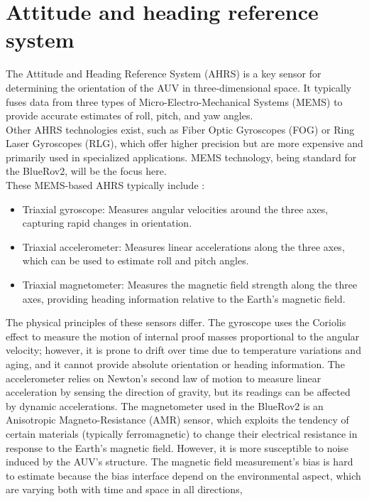 \section{Attitude and heading reference system}
The Attitude and Heading Reference System (AHRS) is a key sensor for determining the orientation of the AUV in three-dimensional space.
It typically fuses data from three types of Micro-Electro-Mechanical Systems (MEMS) to provide accurate estimates of roll, pitch, and yaw angles.\\
Other AHRS technologies exist, such as Fiber Optic Gyroscopes (FOG) or Ring Laser Gyroscopes (RLG), which offer higher precision but are more expensive and primarily used in 
specialized applications. MEMS technology, being standard for the BlueRov2, will be the focus here.\\
These MEMS-based AHRS typically include \cite{klugaMotionSensorsData2024}:
\begin{itemize}
    \item Triaxial gyroscope: Measures angular velocities around the three axes, capturing rapid changes in orientation.
    \item Triaxial accelerometer: Measures linear accelerations along the three axes, which can be used to estimate roll and pitch angles.
    \item Triaxial magnetometer: Measures the magnetic field strength along the three axes, providing heading information relative to the Earth's magnetic field.
\end{itemize}
The physical principles of these sensors differ. The gyroscope uses the Coriolis effect to measure the motion of internal proof masses proportional to the angular 
velocity; however, it is prone to drift over time due to temperature variations and aging, and it cannot provide absolute orientation or heading information. 
The accelerometer relies on Newton's second law of motion to measure linear acceleration by sensing the direction of gravity, but its readings can be affected by dynamic accelerations. 
The magnetometer used in the BlueRov2 is an Anisotropic Magneto-Resistance (AMR) sensor, which exploits the tendency of certain materials (typically ferromagnetic) to change 
their electrical resistance in response to the Earth's magnetic field. However, it is more susceptible to noise induced by the AUV's structure. The magnetic field measurement's bias is hard to 
estimate \cite{troniMagnetometerBiasCalibration2014} because the bias interface depend on the environmental aspect, which are varying both with time and space in all directions, 
